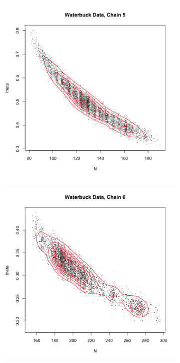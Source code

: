 \documentclass[10pt,psamsfonts]{amsart}
\theoremstyle{definition}
\theoremstyle{remark}
\numberwithin{equation}{section}
\begin{document}
\begin{figure}
\begin{subfigure}[b]{0.3\textwidth}
	\end{subfigure}
	\begin{subfigure}[b]{0.3\textwidth}
		\includegraphics[width=\textwidth]{wonlee_mcmc_waterbuck_5.png}
	\end{subfigure}
	\begin{subfigure}[b]{0.3\textwidth}
		\includegraphics[width=\textwidth]{wonlee_mcmc_waterbuck_6.png}

\end{subfigure}
\end{figure}
\end{document}
